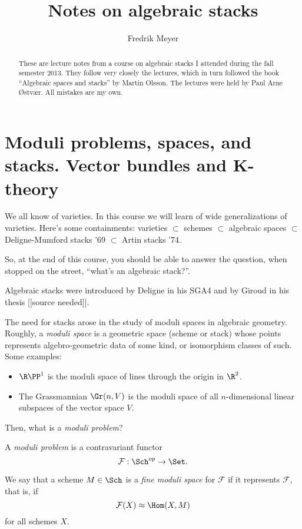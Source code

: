\documentclass[11pt, english]{article}
\title{Notes on algebraic stacks}
\author{Fredrik Meyer}
\date{}
\begin{document}
  
\maketitle 
\begin{abstract}
These are lecture notes from a course on algebraic stacks I attended during the fall semester 2013. They follow very closely the lectures, which in turn followed the book ``Algebraic spaces and stacks'' by Martin Olsson. The lectures were held by Paul Arne Østvær. All mistakes are my own.
\end{abstract}

\tableofcontents

\section{Moduli problems, spaces, and stacks. Vector bundles and K-theory}

We all know of varieties.  In this course we will learn of wide generalizations of varieties. Here's some containments: varieties $\subset$ schemes $\subset$ algebraic spaces $\subset$ Deligne-Mumford stacks '69 $\subset$ Artin stacks '74.

So, at the end of this course, you should be able to answer the question, when stopped on the street, ``what's an algebraic stack?''.

Algebraic stacks were introduced by Deligne in his SGA4 and by Giroud in his thesis [[source needed]].

The need for stacks arose in the study of moduli spaces in algebraic geometry. Roughly, a \emph{moduli space} is a geometric space (scheme or stack) whose points represents algebro-geometric data of some kind, or isomorphism classes of such. Some examples:

\begin{itemize}
\item $\R\PP^1$ is the moduli space of lines through the origin in $\R^2$.
\item The Grassmannian $\Gr(n,V)$ is the moduli space of all $n$-dimensional linear subspaces of the vector space $V$.
\end{itemize}

Then, what is a \emph{moduli problem}?

\begin{defi}
A \emph{moduli problem} is a contravariant functor
\[ \mathcal F : \Sch^{op} \to \Set.
\]
\end{defi}

We say that a scheme $M \in \Sch$ is a \emph{fine moduli space} for $\mathcal F$ if it represents $\mathcal F$, that is, if
\[
\mathcal F (X) \approx \Hom(X,M)
\]
for all schemes $X$.
\end{document}
